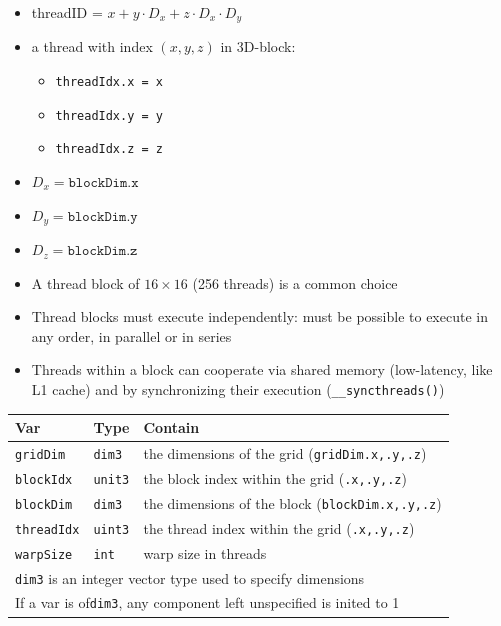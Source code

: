 \begin{minipage}{0.5\linewidth}
  \flushleft
  \begin{itemize}
  \item threadID = $x + y\cdot D_x + z\cdot D_x\cdot D_y$
  \item a thread with index $(x,y,z)$ in 3D-block:
    \begin{itemize}[label=-]
    \item \texttt{threadIdx.x = x}
    \item \texttt{threadIdx.y = y}
    \item \texttt{threadIdx.z = z}
    \end{itemize}
  \item $D_x = \texttt{blockDim.x}$
  \item $D_y = \texttt{blockDim.y}$
  \item $D_z = \texttt{blockDim.z}$
  \end{itemize}
\end{minipage}
\begin{itemize}
\item A thread block of $16\times 16$ (256 threads) is a common choice
\item Thread blocks must execute independently: must be possible to execute in any order, in parallel or in series
\item Threads within a block can cooperate via shared memory (low-latency, like L1 cache) and by synchronizing their execution (\texttt{\_\_syncthreads()})
\end{itemize}
\columnbreak
\begin{tabular}{l|ll}
  \hline
  Var & Type & Contain\\
  \hline
  \texttt{gridDim} & \texttt{dim3} &  the dimensions of the grid (\texttt{gridDim.x,.y,.z})\\
  \texttt{blockIdx} & \texttt{unit3} &  the block index within the grid (\texttt{.x,.y,.z})\\
  \texttt{blockDim} & \texttt{dim3} &  the dimensions of the block (\texttt{blockDim.x,.y,.z})\\
  \texttt{threadIdx} & \texttt{uint3} &  the thread index within the grid (\texttt{.x,.y,.z})\\
  \texttt{warpSize} & \texttt{int} &  warp size in threads\\
  \hline
  \multicolumn{3}{l}{\texttt{dim3} is an integer vector type used to specify dimensions}\\
  \multicolumn{3}{l}{If a var is of\texttt{dim3}, any component left unspecified is inited to 1}\\
  \hline
\end{tabular}
